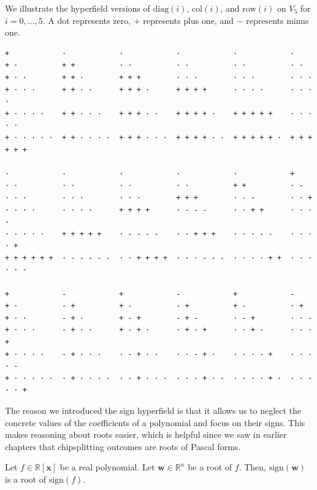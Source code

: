 \begin{example}\label{ex:sign-hyperfield03242}
    We illustrate the hyperfield versions of \( \mathrm{diag}(i) \), \( \mathrm{col}(i) \), and \( \mathrm{row}(i) \) on \( V_5 \) for \( i = 0, \dots, 5 \). A dot represents zero, \( + \) represents plus one, and \( - \) represents minus one.
    \begin{verbatim}
+            ·            ·            ·            ·            ·
+ ·          + +          · ·          · ·          · ·          · ·
+ · ·        + + ·        + + +        · · ·        · · ·        · · ·
+ · · ·      + + · ·      + + + ·      + + + +      · · · ·      · · · ·
+ · · · ·    + + · · ·    + + + · ·    + + + + ·    + + + + +    · · · · ·
+ · · · · ·  + + · · · ·  + + + · · ·  + + + + · ·  + + + + + ·  + + + + + +

·            ·            ·            ·            ·            +
· ·          · ·          · ·          · ·          + +          · -
· · ·        · · ·        · · ·        + + +        · - -        · · +
· · · ·      · · · ·      + + + +      · - - -      · · + +      · · · -
· · · · ·    + + + + +    · - - - -    · · + + +    · · · - -    · · · · +
+ + + + + +  · - - - - -  · · + + + +  · · · - - -  · · · · + +  · · · · · -

+            -            +            -            +            -
+ ·          - +          + -          - +          + -          · +
+ · ·        - + ·        + - +        - + -        · - +        · · -
+ · · ·      - + · ·      + - + ·      · + - +      · · + -      · · · +
+ · · · ·    - + · · ·    · - + · ·    · · - + ·    · · · - +    · · · · -
+ · · · · ·  · + · · · ·  · · + · · ·  · · · + · ·  · · · · + ·  · · · · · +
    \end{verbatim}
\end{example}


The reason we introduced the sign hyperfield is that it allows us to neglect the concrete values of the coefficients of a polynomial and focus on their signs. This makes reasoning about roots easier, which is helpful since we saw in earlier chapters that chipsplitting outcomes are roots of Pascal forms.

\begin{proposition}\label{prop:sign-sikjsfnf}
    Let \( f \in \mathbb{R}[\mathbf{x}] \) be a real polynomial. Let \( \mathbf{w} \in \mathbb{R}^n \) be a root of \( f \). Then, \( \mathrm{sign}(\mathbf{w}) \) is a root of \( \mathrm{sign}(f) \).
\end{proposition}

